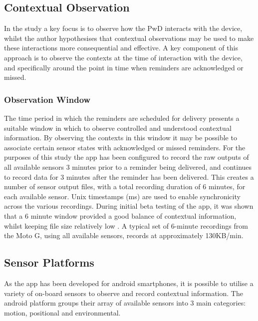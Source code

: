 \subsection{Contextual Observation}
In the study a key focus is to observe how the PwD interacts with the device, whilst the author hypothesises that contextual observations may be used to make these interactions more consequential and effective. A key component of this approach is to observe the contexts at the time of interaction with the device, and specifically around the point in time when reminders are acknowledged or missed.
\subsubsection{Observation Window}
The time period in which the reminders are scheduled for delivery presents a suitable window in which to observe controlled and understood contextual information. By observing the contexts in this window it may be possible to associate certain sensor states with acknowledged or missed reminders.
For the purposes of this study the app has been configured to record the raw outputs of all available sensors 3 minutes prior to a reminder being delivered, and continues to record data for 3 minutes after the reminder has been delivered. This creates a number of sensor output files, with a total recording duration of 6 minutes, for each available sensor.
Unix timestamps (ms) are used to enable synchronicity across the various recordings.
During initial beta testing of the app, it was shown that a 6 minute window provided a good balance of contextual information, whilst keeping file size relatively low \cite{Hartin2014-EMBC}. A typical set of 6-minute recordings from the Moto G, using all available sensors, records at approximately 130KB/min.

\subsection{Sensor Platforms}
As the app has been developed for android smartphones, it is possible to utilise a variety of on-board sensors to observe and record contextual information. The android platform groups their array of available sensors into 3 main categories: motion, positional and environmental.

